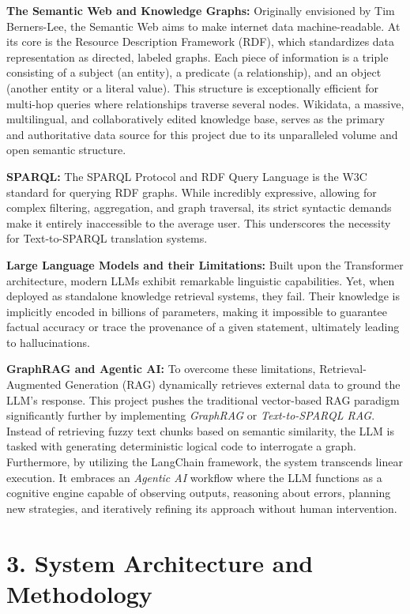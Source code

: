 \textbf{The Semantic Web and Knowledge Graphs:} Originally envisioned by Tim Berners-Lee, the Semantic Web aims to make internet data machine-readable. At its core is the Resource Description Framework (RDF), which standardizes data representation as directed, labeled graphs. Each piece of information is a triple consisting of a subject (an entity), a predicate (a relationship), and an object (another entity or a literal value). This structure is exceptionally efficient for multi-hop queries where relationships traverse several nodes. Wikidata, a massive, multilingual, and collaboratively edited knowledge base, serves as the primary and authoritative data source for this project due to its unparalleled volume and open semantic structure. 

\textbf{SPARQL:} The SPARQL Protocol and RDF Query Language is the W3C standard for querying RDF graphs. While incredibly expressive, allowing for complex filtering, aggregation, and graph traversal, its strict syntactic demands make it entirely inaccessible to the average user. This underscores the necessity for Text-to-SPARQL translation systems.

\textbf{Large Language Models and their Limitations:} Built upon the Transformer architecture, modern LLMs exhibit remarkable linguistic capabilities. Yet, when deployed as standalone knowledge retrieval systems, they fail. Their knowledge is implicitly encoded in billions of parameters, making it impossible to guarantee factual accuracy or trace the provenance of a given statement, ultimately leading to hallucinations. 

\textbf{GraphRAG and Agentic AI:} To overcome these limitations, Retrieval-Augmented Generation (RAG) dynamically retrieves external data to ground the LLM's response. This project pushes the traditional vector-based RAG paradigm significantly further by implementing \textit{GraphRAG} or \textit{Text-to-SPARQL RAG}. Instead of retrieving fuzzy text chunks based on semantic similarity, the LLM is tasked with generating deterministic logical code to interrogate a graph. Furthermore, by utilizing the LangChain framework, the system transcends linear execution. It embraces an \textit{Agentic AI} workflow where the LLM functions as a cognitive engine capable of observing outputs, reasoning about errors, planning new strategies, and iteratively refining its approach without human intervention.

\section*{3. System Architecture and Methodology}

